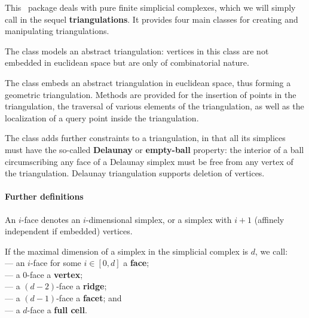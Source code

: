 This \cgal\ package deals with pure finite simplicial complexes, which
we will simply call in the sequel \textbf{triangulations}. It provides four main classes
for creating and manipulating triangulations.

The class  models an abstract triangulation: vertices in this
class are not embedded in euclidean space but are only of combinatorial
nature.

The class  embeds an abstract
triangulation in euclidean space, thus forming a geometric
triangulation. Methods are
provided for the insertion %
of points in the triangulation, the
traversal of various elements of the triangulation, as well as the localization of a
query point inside the triangulation.

The class  adds further
constraints to a triangulation, in that all its simplices must have the
so-called \textbf{Delaunay} or \textbf{empty-ball} property: the interior of
a ball circumscribing any face of a Delaunay simplex must be free from any
vertex of the triangulation. Delaunay triangulation supports deletion
of vertices.



\paragraph{Further definitions}

An $i$-face denotes an $i$-dimensional simplex, or a simplex
with $i+1$ (affinely independent if embedded) vertices.

If the maximal dimension of a simplex in the simplicial complex is
$d$, we call:\\
--- an $i$-face for some $i\in[0,d]$ a  \textbf{face};\\
--- a $0$-face a \textbf{vertex};\\
--- a $(d-2)$-face a \textbf{ridge};\\
--- a $(d-1)$-face a \textbf{facet}; and\\
--- a $d$-face  a \textbf{full cell}.

